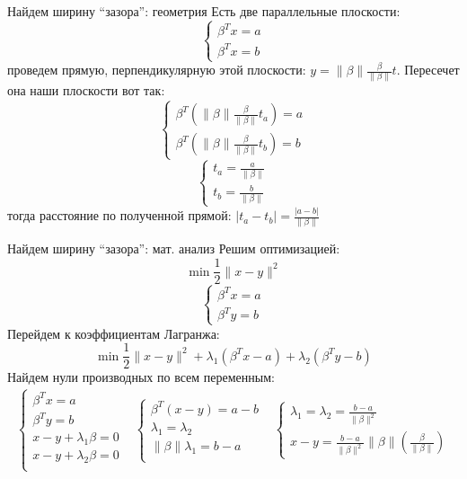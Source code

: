 \documentclass[14pt, fleqn, xcolor={dvipsnames, table}]{beamer}
\begin{document}
\begin{frame}{Найдем ширину ``зазора'': геометрия}
\small
Есть две параллельные плоскости:
$$\left\{\begin{array}{l}
\beta^T x = a \\
\beta^T x = b
\end{array}\right.$$
проведем прямую, перпендикулярную этой плоскости: $y=\|\beta\| \frac{\beta}{\|\beta\|} t$. Пересечет она наши плоскости вот так:
$$\left\{\begin{array}{l}
\beta^T (\|\beta\| \frac{\beta}{\|\beta\|} t_a) = a \\
\beta^T (\|\beta\| \frac{\beta}{\|\beta\|} t_b) = b
\end{array}\right.$$
$$\left\{\begin{array}{l}
t_a = \frac{a}{\|\beta\|} \\
t_b = \frac{b}{\|\beta\|}
\end{array}\right.$$
тогда расстояние по полученной прямой: $|t_a - t_b| = \frac{|a-b|}{\|\beta\|}$ 
\end{frame}

\begin{frame}{Найдем ширину ``зазора'': мат. анализ}
\footnotesize
Решим оптимизацией:
$$
\min \frac{1}{2}\|x - y\|^2
$$
$$\left\{\begin{array}{l}
\beta^T x = a \\
\beta^T y = b
\end{array}\right.
$$
Перейдем к коэффициентам Лагранжа:
$$
\min \frac{1}{2}\|x - y\|^2 + \lambda_1 (\beta^Tx - a) + \lambda_2 (\beta^Ty - b)
$$
Найдем нули производных по всем переменным:
$$
\begin{array}{lll}
\left\{\begin{array}{l}
\beta^T x = a \\
\beta^T y = b \\ 
x - y + \lambda_1 \beta = 0 \\
x - y + \lambda_2 \beta = 0 \\
\end{array}\right.
&
\left\{\begin{array}{l}
\beta^T(x - y) = a - b \\
\lambda_1 = \lambda_2 \\
\|\beta\|\lambda_1 = b - a \\
\end{array}\right.
&
\left\{\begin{array}{l}
\lambda_1 = \lambda_2 = \frac{b-a}{\|\beta\|^2} \\
x - y = \frac{b - a}{\|\beta\|^2}\|\beta\|\left(\frac{\beta}{\|\beta\|}\right)
\end{array}\right.
\end{array}$$
\end{frame}
\end{document}
